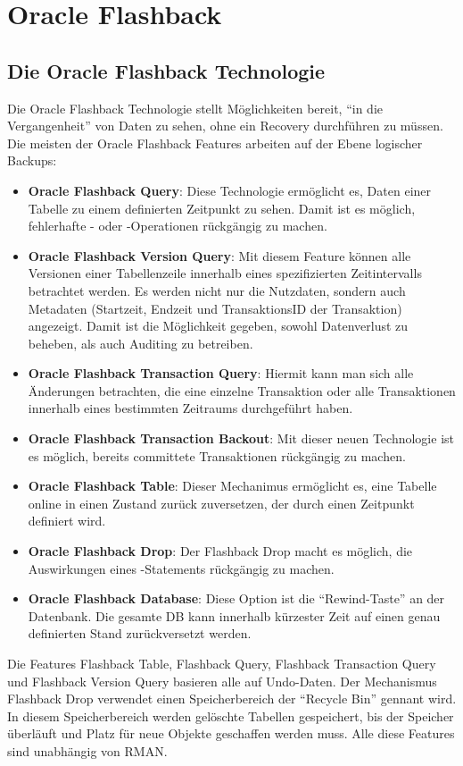 \chapter{Oracle Flashback}
    \setcounter{page}{1}
    \minitoc
\newpage
    \section{Die Oracle Flashback Technologie}
      Die Oracle Flashback Technologie stellt M\"oglichkeiten bereit,
      \enquote{in die Vergangenheit} von Daten zu sehen, ohne ein Recovery
      durchf\"uhren zu m\"ussen. Die meisten der Oracle Flash\-back Features
      arbeiten auf der Ebene logischer Backups:
      \begin{itemize}
        \item \textbf{Oracle Flashback Query}: Diese Technologie erm\"oglicht es, Daten einer Tabelle zu einem definierten Zeitpunkt zu sehen. Damit ist es m\"oglich, fehlerhafte - oder -Operationen r\"uckg\"angig zu machen.
        \item \textbf{Oracle Flashback Version Query}: Mit diesem Feature k\"onnen alle Versionen einer Tabellenzeile innerhalb eines spezifizierten Zeitintervalls betrachtet werden. Es werden nicht nur die Nutzdaten, sondern auch Metadaten (Startzeit, Endzeit und TransaktionsID der Transaktion) angezeigt. Damit ist die M\"oglichkeit gegeben, sowohl Datenverlust zu beheben, als auch Auditing zu betreiben.
        \item \textbf{Oracle Flashback Transaction Query}: Hiermit kann man sich alle \"Anderungen betrachten, die eine einzelne Transaktion oder alle Transaktionen innerhalb eines bestimmten Zeitraums durchgef\"uhrt haben.
        \item \textbf{Oracle Flashback Transaction Backout}: Mit dieser neuen Technologie ist es m\"oglich, bereits committete Transaktionen r\"uckg\"angig zu machen.
        \item \textbf{Oracle Flashback Table}: Dieser Mechanimus erm\"oglicht es, eine Tabelle online in einen Zustand zur\"uck zuversetzen, der durch einen Zeitpunkt definiert wird.
        \item \textbf{Oracle Flashback Drop}: Der Flashback Drop macht es m\"oglich, die Auswirkungen eines -Statements r\"uckg\"angig zu machen.
        \item \textbf{Oracle Flashback Database}: Diese Option ist die \enquote{Rewind-Taste} an der Datenbank. Die gesamte DB kann innerhalb k\"urzester Zeit auf einen genau definierten Stand zur\"uckversetzt werden.
      \end{itemize}
      Die Features Flashback Table, Flashback Query, Flashback Transaction Query und Flash\-back Version Query basieren alle auf Undo-Daten. Der Mechanismus Flashback Drop verwendet einen Speicherbereich der \enquote{Recycle Bin} gennant wird. In diesem Speicherbereich werden gel\"oschte Tabellen gespeichert, bis der Speicher \"uberl\"auft und Platz f\"ur neue Objekte geschaffen werden muss. Alle diese Features sind unabh\"angig von RMAN.

